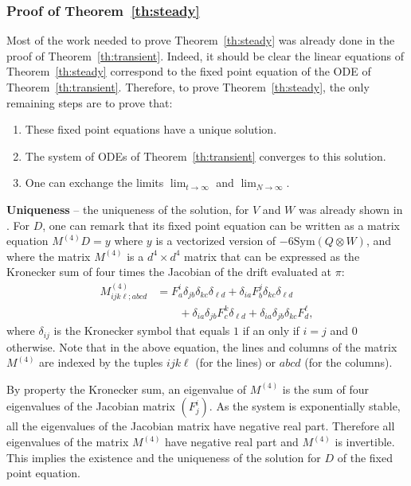 \documentclass[sigconf]{acmart}
\newcommand\Sym{\mathrm{Sym}}
\begin{document}
\subsubsection{Proof of Theorem~\ref{th:steady}}

Most of the work needed to prove Theorem~\ref{th:steady} was already
done in the proof of Theorem~\ref{th:transient}. Indeed, it should be
clear the linear equations of Theorem~\ref{th:steady} correspond to
the fixed point equation of the ODE of
Theorem~\ref{th:transient}. Therefore, to prove
Theorem~\ref{th:steady}, the only remaining steps are to prove that:
\begin{enumerate}
\item These fixed point equations have a unique solution.
\item The system of ODEs of Theorem~\ref{th:transient} converges to
  this solution.
\item One can exchange the limits $\lim_{t\to\infty}$ and
  $\lim_{N\to\infty}$.
\end{enumerate}

\textbf{Uniqueness} -- the uniqueness of the solution, for $V$ and $W$
was already shown in \cite{gast2017refined}. For $D$, one can remark
that its fixed point equation can be written as a matrix equation
$M^{(4)}D=y$ where $y$ is a vectorized version of
$-6 \Sym(Q\otimes W)$, and where the matrix $M^{(4)}$ is a
$d^4\times d^4$ matrix that can be expressed as the Kronecker sum of
four times the Jacobian of the drift evaluated at $\pi$:
\begin{align}
  M^{(4)}_{ijk\ell; abcd}&= F^i_a\delta_{jb}\delta_{kc}\delta_{\ell d} +
                           \delta_{ia}F^j_b\delta_{kc}\delta_{\ell
                           d}\nonumber\\ 
                         &\qquad + \delta_{ia}\delta_{jb}F^k_c\delta_{\ell
                           d} +
                           \delta_{ia}\delta_{jb}\delta_{kc}F^\ell_d,
                           \label{eq:M^4}
\end{align}
where $\delta_{ij}$ is the Kronecker symbol that equals $1$ if an only
if $i=j$ and $0$ otherwise.  Note that in the above equation, the
lines and columns of the matrix $M^{(4)}$ are indexed by the tuples
$ijk\ell$ (for the lines) or $abcd$ (for the columns).

By property the Kronecker sum, an eigenvalue of $M^{(4)}$ is the sum
of four eigenvalues of the Jacobian matrix $(F^i_j)$. As the system is
exponentially stable, all the eigenvalues of the Jacobian matrix have
negative real part. Therefore all eigenvalues of the matrix $M^{(4)}$
have negative real part and $M^{(4)}$ is invertible. This implies the
existence and the uniqueness of the solution for $D$ of the fixed
point equation.
\end{document}
